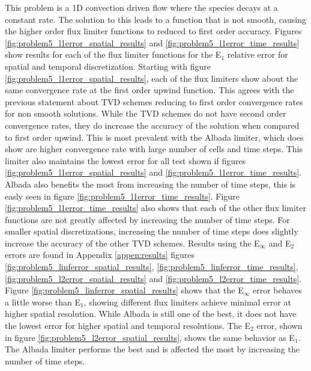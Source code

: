 This problem is a 1D convection driven flow where the species decays at a constant rate. The solution to this leads to a function that is not smooth, causing the higher order flux limiter functions to reduced to first order accuracy. Figures \ref{fig:problem5_l1error_spatial_results} and \ref{fig:problem5_l1error_time_results} show results for each of the flux limiter functions for the E${}_{1}$ relative error for spatial and temporal discretization. Starting with figure \ref{fig:problem5_l1error_spatial_results}, each of the flux limiters show about the same convergence rate at the first order upwind function. This agrees with the previous statement about TVD schemes reducing to first order convergence rates for non smooth solutions. While the TVD schemes do not have second order convergence rates, they do increase the accuracy of the solution when compared to first order upwind. This is most prevalent with the Albada limiter, which does show are higher convergence rate with large number of cells and time steps. This limiter also maintains the lowest error for all test shown if figures \ref{fig:problem5_l1error_spatial_results} and \ref{fig:problem5_l1error_time_results}. Albada also benefits the most from increasing the number of time steps, this is easly seen in figure \ref{fig:problem5_l1error_time_results}. Figure \ref{fig:problem5_l1error_time_results} also shows that each of the other flux limiter functions are not greatly affected by increasing the number of time steps. For smaller spatial discretizations, increasing the number of time steps does slightly increase the accuracy of the other TVD schemes. Results using the E${}_{\infty}$ and E${}_{2}$ errors are found in Appendix \ref{appen:results} figures \ref{fig:problem5_linferror_spatial_results}, \ref{fig:problem5_linferror_time_results}, \ref{fig:problem5_l2error_spatial_results} and \ref{fig:problem5_l2error_time_results}. Figure \ref{fig:problem5_linferror_spatial_results} shows that the E${}_{\infty}$ error behaves a little worse than E${}_{1}$, showing different flux limiters achieve minimal error at higher spatial resolution. While Albada is still one of the best, it does not have the lowest error for higher spatial and temporal resolutions. The E${}_{2}$ error, shown in figure \ref{fig:problem5_l2error_spatial_results}, shows the same behavior as E${}_{1}$. The Albada limiter performs the best and is affected the most by increasing the number of time steps.  

